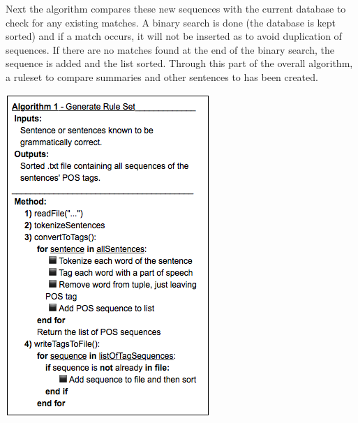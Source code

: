 \documentclass[11pt,a4paper]{article}
\newenvironment{Figure}
  {\par\medskip\noindent\minipage{\linewidth}}
  {\endminipage\par\medskip}
\begin{document}
\begin{multicols}{2}
Next the algorithm compares these new sequences with the current database to check for any existing matches. A binary search is done (the database is kept sorted) and if a match occurs, it will not be inserted as to avoid duplication of sequences. If there are no matches found at the end of the binary search, the sequence is added and the list sorted. Through this part of the overall algorithm, a ruleset to compare summaries and other sentences to has been created.

\begin{Figure}  
   \centering
   \includegraphics[width=\linewidth]{GenerateAlgorithm}
\end{Figure}   


\end{multicols}
\end{document}
